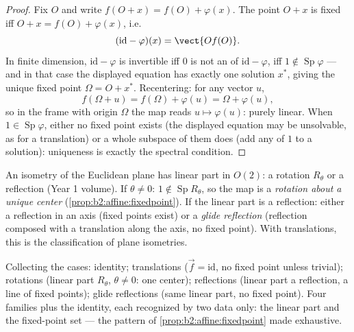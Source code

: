 \begin{proof}
Fix $O$ and write $f(O + x) = f(O) + \varphi(x)$. The point
$O + x$ is fixed iff $O + x = f(O) + \varphi(x)$, i.e.
\[
(\mathrm{id} - \varphi)(x) = \vect{O f(O)} .
\]
In finite dimension, $\mathrm{id} - \varphi$ is invertible
iff $0$ is not an  of $\mathrm{id} - \varphi$, iff
$1 \notin \operatorname{Sp}\varphi$ --- and in that case the
displayed equation has exactly one solution $x^*$, giving the
unique fixed point $\Omega = O + x^*$. Recentering: for any
vector $u$,
\[
f(\Omega + u) = f(\Omega) + \varphi(u) = \Omega + \varphi(u),
\]
so in the frame with origin $\Omega$ the map reads $u \mapsto
\varphi(u)$: purely linear. When $1 \in
\operatorname{Sp}\varphi$, either no fixed point exists (the
displayed equation may be unsolvable, as for a translation)
or a whole  subspace of them does (add any 
of  $1$ to a solution): uniqueness is exactly the
spectral condition.
\end{proof}

\begin{example}\label{ex:b2:affine:isometries}
An  isometry of the Euclidean plane has linear part in
$O(2)$: a rotation $R_\theta$ or a reflection (Year 1 volume). If
$\theta \neq 0$: $1 \notin \operatorname{Sp} R_\theta$, so the map
is a \emph{rotation about a unique center}
(\cref{prop:b2:affine:fixedpoint}). If the linear part is a
reflection: either a reflection in an axis (fixed points exist) or
a \emph{glide reflection} (reflection composed with a translation
along the axis, no fixed point). With translations, this is the
 classification of plane isometries.
\end{example}

\begin{remark}
Collecting the cases: identity; translations ($\vec f =
\mathrm{id}$, no fixed point unless trivial); rotations
(linear part $R_\theta$, $\theta \neq 0$: one center);
reflections (linear part a reflection, a line of fixed
points); glide reflections (same linear part, no fixed
point). Four families plus the identity, each recognized by
two data only: the linear part and the fixed-point set ---
the pattern of \cref{prop:b2:affine:fixedpoint} made
exhaustive.
\end{remark}

